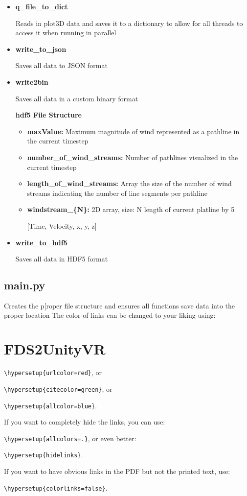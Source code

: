 \begin{itemize}
    \item \textbf{q\_file\_to\_dict}
    \item[] Reads in plot3D data and saves it to a dictionary to allow for all threads to access it when running in parallel 

    \item \textbf{write\_to\_json}
    \item[] Saves all data to JSON format

    \item \textbf{write2bin}
    \item[] Saves all data in a custom binary format
    \item[] \textbf{hdf5 File Structure}   
                \begin{itemize}
                \item\textbf{maxValue:} Maximum magnitude of wind represented as a pathline in the current timestep
                \item\textbf{number\_of\_wind\_streams:} Number of pathlines visualized in the current timestep
                \item\textbf{length\_of\_wind\_streams:} Array the size of the number of wind streams indicating the number of line segments per pathline
                \item\textbf{windstream\_\{N\}:} 2D array, size: N {length of current platline}  by 5
                \item[] [Time, Velocity, x, y, z]

                \end{itemize} 
    \item \textbf{write\_to\_hdf5}
    \item[] Saves all data in HDF5 format


\end{itemize}

\subsection{main.py}
\label{PythonMain}
Creates the p[roper file structure and ensures all functions save data into the proper location  
The color of links can be changed to your liking using:


\section{FDS2UnityVR}

{\small\verb!\hypersetup{urlcolor=red}!}, or

{\small\verb!\hypersetup{citecolor=green}!}, or

{\small\verb!\hypersetup{allcolor=blue}!}.

\noindent If you want to completely hide the links, you can use:

{\small\verb!\hypersetup{allcolors=.}!}, or even better: 

{\small\verb!\hypersetup{hidelinks}!}.

\noindent If you want to have obvious links in the PDF but not the printed text, use:

{\small\verb!\hypersetup{colorlinks=false}!}.
